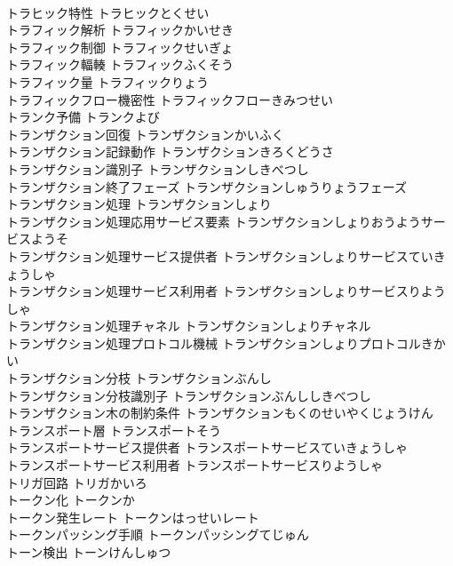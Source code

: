 \documentclass[8pt]{extreport}
\begin{document}
\begin{CJK}{UTF8}{min}
\\	トラヒック特性	トラヒックとくせい	
\\	トラフィック解析	トラフィックかいせき	
\\	トラフィック制御	トラフィックせいぎょ	
\\	トラフィック輻輳	トラフィックふくそう	
\\	トラフィック量	トラフィックりょう	
\\	トラフィックフロー機密性	トラフィックフローきみつせい	
\\	トランク予備	トランクよび	
\\	トランザクション回復	トランザクションかいふく	
\\	トランザクション記録動作	トランザクションきろくどうさ	
\\	トランザクション識別子	トランザクションしきべつし	
\\	トランザクション終了フェーズ	トランザクションしゅうりょうフェーズ	
\\	トランザクション処理	トランザクションしょり	
\\	トランザクション処理応用サービス要素	トランザクションしょりおうようサービスようそ	
\\	トランザクション処理サービス提供者	トランザクションしょりサービスていきょうしゃ	
\\	トランザクション処理サービス利用者	トランザクションしょりサービスりようしゃ	
\\	トランザクション処理チャネル	トランザクションしょりチャネル	
\\	トランザクション処理プロトコル機械	トランザクションしょりプロトコルきかい	
\\	トランザクション分枝	トランザクションぶんし	
\\	トランザクション分枝識別子	トランザクションぶんししきべつし	
\\	トランザクション木の制約条件	トランザクションもくのせいやくじょうけん	
\\	トランスポート層	トランスポートそう	
\\	トランスポートサービス提供者	トランスポートサービスていきょうしゃ	
\\	トランスポートサービス利用者	トランスポートサービスりようしゃ	
\\	トリガ回路	トリガかいろ	
\\	トークン化	トークンか	
\\	トークン発生レート	トークンはっせいレート	
\\	トークンパッシング手順	トークンパッシングてじゅん	
\\	トーン検出	トーンけんしゅつ	

\end{CJK}
\end{document}
